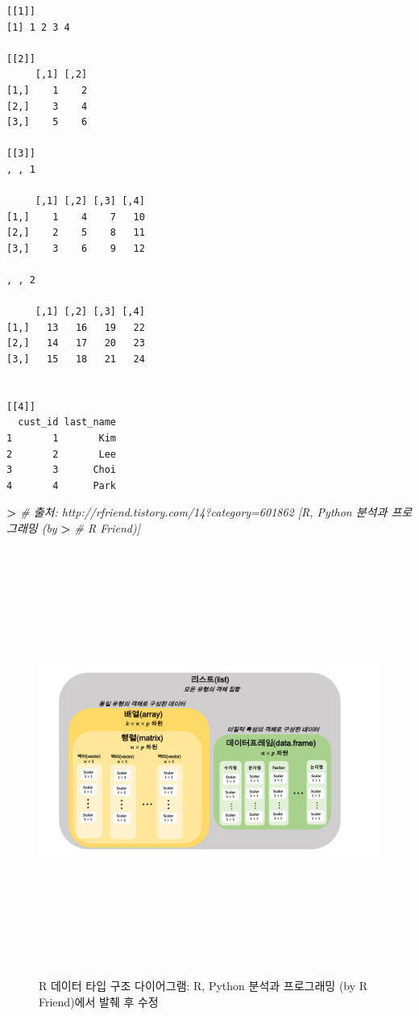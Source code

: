 \documentclass[11pt,a4paper]{book}
\newenvironment{Shaded}{\begin{snugshade}}{\end{snugshade}}
\newcommand{\StringTok}[1]{\textcolor[rgb]{0.31,0.60,0.02}{#1}}
\newcommand{\CommentTok}[1]{\textcolor[rgb]{0.56,0.35,0.01}{\textit{#1}}}
\newcommand{\OperatorTok}[1]{\textcolor[rgb]{0.81,0.36,0.00}{\textbf{#1}}}
\newcommand{\ErrorTok}[1]{\textcolor[rgb]{0.64,0.00,0.00}{\textbf{#1}}}
\theoremstyle{definition}
\theoremstyle{definition}
\theoremstyle{definition}
\theoremstyle{remark}
\begin{document}
\begin{verbatim}
[[1]]
[1] 1 2 3 4

[[2]]
     [,1] [,2]
[1,]    1    2
[2,]    3    4
[3,]    5    6

[[3]]
, , 1

     [,1] [,2] [,3] [,4]
[1,]    1    4    7   10
[2,]    2    5    8   11
[3,]    3    6    9   12

, , 2

     [,1] [,2] [,3] [,4]
[1,]   13   16   19   22
[2,]   14   17   20   23
[3,]   15   18   21   24


[[4]]
  cust_id last_name
1       1       Kim
2       2       Lee
3       3      Choi
4       4      Park
\end{verbatim}

\begin{Shaded}
\begin{Highlighting}[]
\OperatorTok{>}\StringTok{ }\CommentTok{# 출처: http://rfriend.tistory.com/14?category=601862 [R, Python 분석과 프로그래밍 (by}
\ErrorTok{>}\StringTok{ }\CommentTok{# R Friend)]}
\end{Highlighting}
\end{Shaded}

\normalsize

\begin{figure}[H] {
  \centering
  \includegraphics[width = 15cm, height = 14cm]{Figures/datatype-diagram}
  \caption[R 데이터 타입 구조 다이어그램]{R 데이터 타입 구조 다이어그램: R, Python 분석과 프로그래밍 (by R Friend)에서 발췌 후 수정}\label{fig:R-datatype}
} \end{figure}

\vspace{1cm}

\renewcommand\bibname{References}

\end{document}
